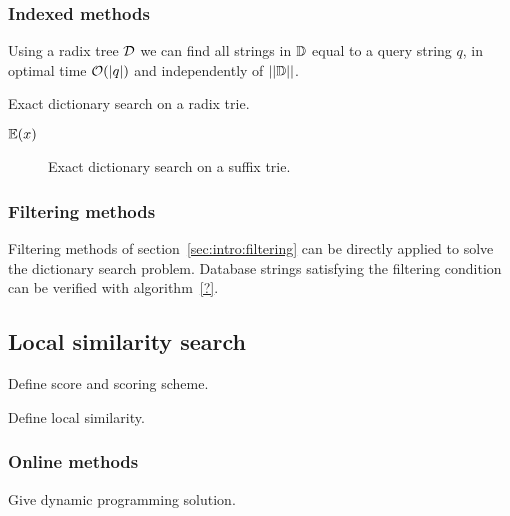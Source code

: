\subsubsection{Indexed methods}

Using a radix tree $\mathcal {D}$ we can find all strings in $\mathbb {D}$ equal to a query string $q$, in optimal time $\mathcal{O}(|q|)$ and independently of $||\mathbb {D}||$.

\begin{algorithm}[h]
\caption{Exact dictionary search on a radix trie.}
\label{alg:dict-exact}
\begin{algorithmic}[1]
		\State \Report $\mathbb {E}(x)$
		\State {}
	\EndIf
\EndProcedure
\end{algorithmic}
\end{algorithm}

\begin{figure}[h]
\begin{center}
\caption{Exact dictionary search on a suffix trie.}
\label{fig:dict-exact}

\end{center}
\end{figure}

\subsubsection{Filtering methods}

Filtering methods of section~\ref{sec:intro:filtering} can be directly applied to solve the dictionary search problem. Database strings satisfying the filtering condition can be verified with algorithm~\ref{?}.




\subsection{Local similarity search}

Define score and scoring scheme.

Define local similarity.

\subsubsection{Online methods}
Give dynamic programming solution.

